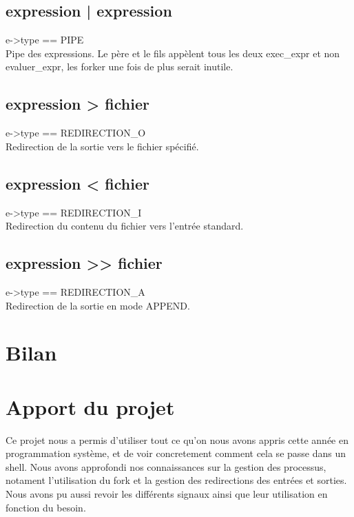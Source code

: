 \documentclass[12pt]{report}
\begin{document}
\subsection{expression | expression}
e->type == PIPE\\
Pipe des expressions. Le père et le fils appèlent tous les deux exec\_expr et non evaluer\_expr,
les forker une fois de plus serait inutile.

\subsection{expression > fichier}
e->type == REDIRECTION\_O\\
Redirection de la sortie vers le fichier spécifié.

\subsection{expression < fichier}
e->type == REDIRECTION\_I\\
Redirection du contenu du fichier vers l'entrée standard.
   

\subsection{expression >> fichier}
e->type == REDIRECTION\_A\\
Redirection de la sortie en mode APPEND.   


\newpage
\section{Bilan}

\newpage
\section{Apport du projet}
Ce projet nous a permis d'utiliser tout ce qu'on nous avons appris cette année en programmation système, et de voir concretement comment cela se passe dans un shell.
Nous avons approfondi nos connaissances sur la gestion des processus, notament l'utilisation du fork et la gestion des redirections des entrées et sorties.
Nous avons pu aussi revoir les différents signaux ainsi que leur utilisation en fonction du besoin.
\end{document}
